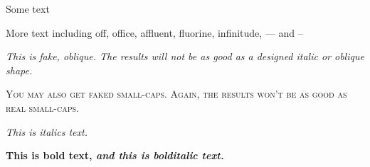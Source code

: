 \documentclass{article}
\begin{document}
Some text

 More text including off, office, affluent, fluorine, infinitude, --- and --

\slshape This is fake, oblique. The results will not be as good as a designed italic or oblique shape.

\upshape\scshape You may also get faked small-caps. Again, the results won't be as good as real small-caps.

\upshape\itshape This is italics text.

\textbf{This is bold text, \textit{and this is bolditalic text.}}
\end{document}
